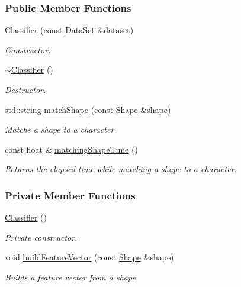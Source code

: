 \subsubsection*{Public Member Functions}
\begin{CompactItemize}
\item 
\hyperlink{class_classifier_9e4bb9d0578609751dfb7cffb77b804f}{Classifier} (const \hyperlink{class_data_set}{DataSet} \&dataset)
\begin{CompactList}\small\item\em Constructor. \item\end{CompactList}\item 
\hyperlink{class_classifier_7831f2accc6c1e98ba11ba5ee67f6d0c}{$\sim$Classifier} ()
\begin{CompactList}\small\item\em Destructor. \item\end{CompactList}\item 
std::string \hyperlink{class_classifier_6fd6a8332d3188ac605ff452ab6dc9c2}{matchShape} (const \hyperlink{class_shape}{Shape} \&shape)
\begin{CompactList}\small\item\em Matchs a shape to a character. \item\end{CompactList}\item 
const float \& \hyperlink{class_classifier_775756b0f6e5472a13bb1fa15290f14c}{matchingShapeTime} ()
\begin{CompactList}\small\item\em Returns the elapsed time while matching a shape to a character. \item\end{CompactList}\end{CompactItemize}
\subsubsection*{Private Member Functions}
\begin{CompactItemize}
\item 
\hyperlink{class_classifier_e6132b100c96a4f3d8ad3885b5acb28e}{Classifier} ()
\begin{CompactList}\small\item\em Private constructor. \item\end{CompactList}\item 
void \hyperlink{class_classifier_6c5a7ef6298b0f0d84873297f1e8c7e9}{buildFeatureVector} (const \hyperlink{class_shape}{Shape} \&shape)
\begin{CompactList}\small\item\em Builds a feature vector from a shape. \item\end{CompactList}\end{CompactItemize}
